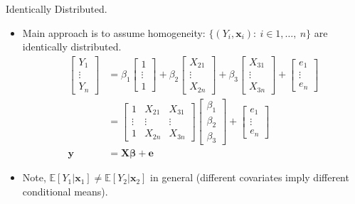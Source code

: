 \documentclass[aspectratio=169, handout]{beamer}
\numberwithin{equation}{section}
\begin{document}
\begin{frame}{Identically Distributed.}
\begin{itemize}
\item Main approach is to assume homogeneity: $\{(Y_i, \bm{x}_i):\ i\in1,\ldots,\ n\}$ are identically distributed.
\begin{align*}
\begin{bmatrix}Y_1\\ \vdots \\Y_n\end{bmatrix}&=\beta_1\begin{bmatrix}1 \\\vdots\\1\end{bmatrix}+\beta_2 \begin{bmatrix}X_{21} \\ \vdots \\ X_{2n}\end{bmatrix}+\beta_3 \begin{bmatrix}X_{31} \\\vdots\\ X_{3n} \end{bmatrix}+\begin{bmatrix}e_1 \\ \vdots \\ e_n\end{bmatrix}
\\
&=\begin{bmatrix}1 &X_{21}& X_{31} \\\vdots &\vdots& \vdots  \\1  &X_{2n}& X_{3n} \end{bmatrix} \begin{bmatrix} \beta_1\\ \beta_2 \\ \beta_3 \end{bmatrix}+\begin{bmatrix}e_1 \\ \vdots \\ e_n\end{bmatrix}\\
\bm{y}&=\bm{X}\bm{\beta}+\bm{e}
\end{align*}
\item Note, $\mathbb{E}[Y_1|\bm{x}_1]\neq \mathbb{E}[Y_2|\bm{x}_2]$ in general (different covariates imply different conditional means).
\end{itemize}
\end{frame}
\end{document}
